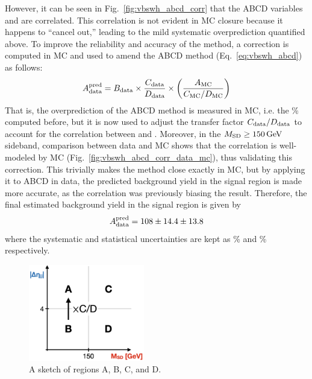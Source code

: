 However, it can be seen in Fig.~\ref{fig:vbswh_abcd_corr} that the ABCD variables \detajj and \MSD are correlated.
This correlation is not evident in MC closure because it happens to ``cancel out,'' leading to the mild systematic overprediction quantified above. 
To improve the reliability and accuracy of the method, a correction is computed in MC and used to amend the ABCD method (Eq.~\ref{eq:vbswh_abcd}) as follows:
\begin{equation*}
    A_{\text{data}}^\text{pred} = B_{\text{data}}\times\frac{C_{\text{data}}}{D_{\text{data}}}\times\bigg(\frac{A_{\mathrm{MC}}}{C_{\mathrm{MC}}/D_{\mathrm{MC}}}\bigg)
\end{equation*}
That is, the overprediction of the ABCD method is measured in MC, i.e. the \BkgEstTotalSystErr\% computed before, but it is now used to adjust the transfer factor $C_{\text{data}}/D_{\text{data}}$ to account for the correlation between \MSD and \detajj. 
Moreover, in the $M_{\mathrm{SD}} \geq 150\,\text{Ge\hspace{-.08em}V}$ sideband, comparison between data and MC shows that the correlation is well-modeled by MC (Fig.~\ref{fig:vbswh_abcd_corr_data_mc}), thus validating this correction. 
This trivially makes the method close exactly in MC, but by applying it to ABCD in data, the predicted background yield in the signal region is made more accurate, as the correlation was previously biasing the result.
Therefore, the final estimated background yield in the signal region is given by
\begin{equation*}
    A_{\text{data}}^{\text{pred}} = 108 \pm 14.4 \pm 13.8
\end{equation*}
where the systematic and statistical uncertainties are kept as \BkgEstTotalSystErr\% and \BkgEstStatErr\% respectively.

\begin{figure}[htb]
    \centering
    \includegraphics[width=0.45\textwidth]{fig/vbswh/abcd_cartoon.png}
    \caption{
        A sketch of regions A, B, C, and D.
    }
    \label{fig:abcd_cartoon}
\end{figure}

